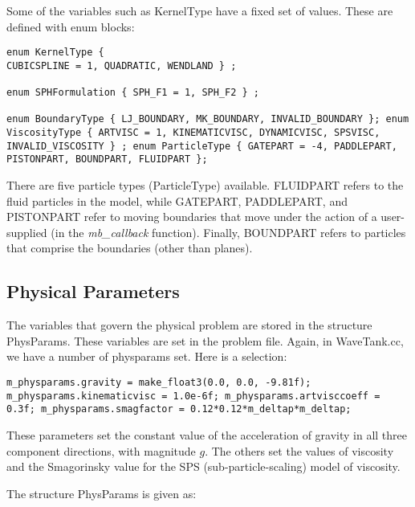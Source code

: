 \documentclass[12pt]{memoir}
\begin{document}
Some of the variables such as KernelType have a fixed set of values.
These are defined with enum blocks: 
\begin{verbatim} 
enum KernelType {
CUBICSPLINE = 1, QUADRATIC, WENDLAND } ;

enum SPHFormulation { SPH_F1 = 1, SPH_F2 } ;

enum BoundaryType { LJ_BOUNDARY, MK_BOUNDARY, INVALID_BOUNDARY }; enum
ViscosityType { ARTVISC = 1, KINEMATICVISC, DYNAMICVISC, SPSVISC,
INVALID_VISCOSITY } ; enum ParticleType { GATEPART = -4, PADDLEPART,
PISTONPART, BOUNDPART, FLUIDPART }; 
\end{verbatim}

There are five particle types (ParticleType) available. FLUIDPART
refers to the fluid particles in the model, while GATEPART, PADDLEPART,
and PISTONPART refer to moving boundaries that move under the action of
a user-supplied (in the {\em mb\_callback} function). Finally,
BOUNDPART refers to particles that comprise the boundaries (other than
planes).

\subsection{Physical Parameters} The variables that govern the physical
problem are stored in the structure PhysParams. These variables are set
in the problem file. Again, in WaveTank.cc, we have a number of
physparams set. Here is a selection: 
\begin{verbatim}
m_physparams.gravity = make_float3(0.0, 0.0, -9.81f);
m_physparams.kinematicvisc = 1.0e-6f; m_physparams.artvisccoeff =
0.3f; m_physparams.smagfactor = 0.12*0.12*m_deltap*m_deltap;
\end{verbatim} 
These parameters set the constant value of the
acceleration of gravity in all three component directions, with
magnitude $g$. The others set the values of viscosity and the
Smagorinsky value for the SPS (sub-particle-scaling) model of viscosity.

The structure PhysParams is given as:
\end{document}
